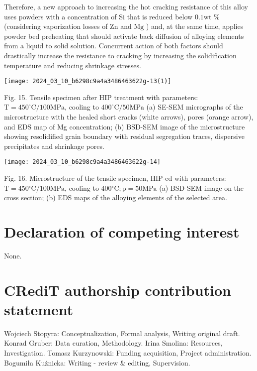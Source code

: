 \documentclass[10pt]{article}
\begin{document}
Therefore, a new approach to increasing the hot cracking resistance of this alloy uses powders with a concentration of $\mathrm{Si}$ that is reduced below $0.1 \mathrm{wt}$ \% (considering vaporization losses of $\mathrm{Zn}$ and $\mathrm{Mg}$ ) and, at the same time, applies powder bed preheating that should activate back diffusion of alloying elements from a liquid to solid solution. Concurrent action of both factors should drastically increase the resistance to cracking by increasing the solidification temperature and reducing shrinkage stresses.

\begin{center}
\texttt{[image: 2024\_03\_10\_b6298c9a4a3486463622g-13(1)]}
\end{center}

Fig. 15. Tensile specimen after HIP treatment with parameters: $\mathrm{T}=450^{\circ} \mathrm{C} / 100 \mathrm{MPa}$, cooling to $400^{\circ} \mathrm{C} / 50 \mathrm{MPa}$ (a) SE-SEM micrographs of the microstructure with the healed short cracks (white arrows), pores (orange arrow), and EDS map of Mg concentration; (b) BSD-SEM image of the microstructure showing resolidified grain boundary with residual segregation traces, dispersive precipitates and shrinkage pores.

\begin{center}
\texttt{[image: 2024\_03\_10\_b6298c9a4a3486463622g-14]}
\end{center}

Fig. 16. Microstructure of the tensile specimen, HIP-ed with parameters: $\mathrm{T}=450{ }^{\circ} \mathrm{C} / 100 \mathrm{MPa}$, cooling to $400{ }^{\circ} \mathrm{C} ; \mathrm{p}=50 \mathrm{MPa}$ (a) BSD-SEM image on the cross section; (b) EDS maps of the alloying elements of the selected area.

\section*{Declaration of competing interest}
None.

\section*{CRediT authorship contribution statement}
Wojciech Stopyra: Conceptualization, Formal analysis, Writing original draft. Konrad Gruber: Data curation, Methodology. Irina Smolina: Resources, Investigation. Tomasz Kurzynowski: Funding acquisition, Project administration. Bogumiła Kuźnicka: Writing - review \& editing, Supervision.
\end{document}
